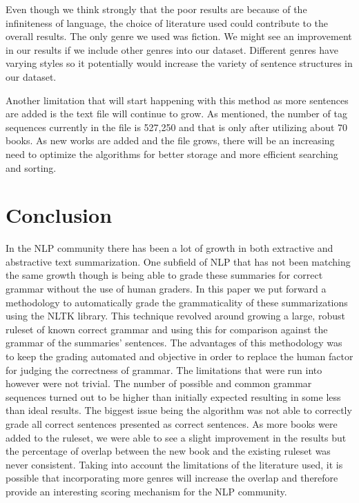 \documentclass[11pt,a4paper]{article}
\begin{document}
\begin{multicols}{2}
Even though we think strongly that the poor results are because of the infiniteness of language, the choice of literature used could contribute to the overall results. The only genre we used was fiction. We might see an improvement in our results if we include other genres into our dataset. Different genres have varying styles so it potentially would increase the variety of sentence structures in our dataset.

Another limitation that will start happening with this method as more sentences are added is the text file will continue to grow. As mentioned, the number of tag sequences currently in the file is 527,250 and that is only after utilizing about 70 books. As new works are added and the file grows, there will be an increasing need to optimize the algorithms for better storage and more efficient searching and sorting.

\section{Conclusion}
In the NLP community there has been a lot of growth in both extractive and abstractive text summarization. One subfield of NLP that has not been matching the same growth though is being able to grade these summaries for correct grammar without the use of human graders. In this paper we put forward a methodology to automatically grade the grammaticality of these summarizations using the NLTK library. This technique revolved around growing a large, robust ruleset of known correct grammar and using this for comparison against the grammar of the summaries' sentences. The advantages of this methodology was to keep the grading automated and objective in order to replace the human factor for judging the correctness of grammar. The limitations that were run into however were not trivial. The number of possible and common grammar sequences turned out to be higher than initially expected resulting in some less than ideal results. The biggest issue being the algorithm was not able to correctly grade all correct sentences presented as correct sentences. As more books were added to the ruleset, we were able to see a slight improvement in the results but the percentage of overlap between the new book and the existing ruleset was never consistent. Taking into account the limitations of the literature used, it is possible that incorporating more genres will increase the overlap and therefore provide an interesting scoring mechanism for the NLP community.


\end{multicols}
\end{document}
